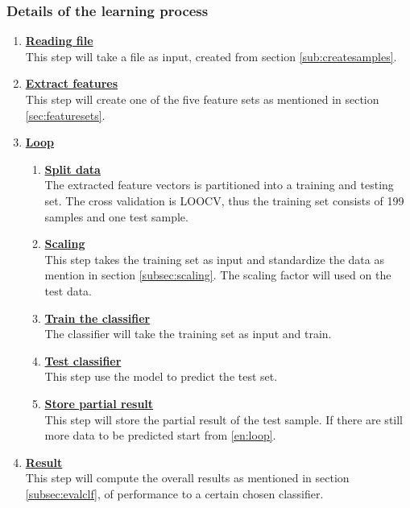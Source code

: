 \documentclass[USenglish]{ifimaster}  %
\begin{document}
\subsubsection{Details of the learning process} \label{sub:learningprocess}
\begin{enumerate}
\item \textbf{\underline{Reading file}}
\\
This step will take a file as input, created from section \ref{sub:createsamples}.
		
\item \textbf{\underline{Extract features}}
\\
This step will create one of the five feature sets as mentioned in section \ref{sec:featuresets}.
		
\item \textbf{\underline{Loop}}
		
\begin{enumerate} 
\item \textbf{\underline{Split data}} \label{en:loop}
\\
The extracted feature vectors is partitioned into a training and testing set. The cross validation is LOOCV, thus the training set consists of 199 samples and one test sample.
			
\item \textbf{\underline{Scaling}}
\\
This step takes the training set as input and standardize the data as mention in section \ref{subsec:scaling}. The scaling factor will used on the test data.
			
\item \textbf{\underline{Train the classifier}}
\\
The classifier will take the training set as input and train.
			
\item \textbf{\underline{Test classifier}} 
\\
This step use the model to predict the test set.

\item \textbf{\underline{Store partial result}} 
\\
This step will store the partial result of the test sample. If there are still more data to be predicted start from \ref{en:loop}.
\end{enumerate}	
		
\item \textbf{\underline{Result}}
\\
This step will compute the overall results as mentioned in section \ref{subsec:evalclf}, of performance to a certain chosen classifier. 
\end{enumerate}
	
\end{document}
